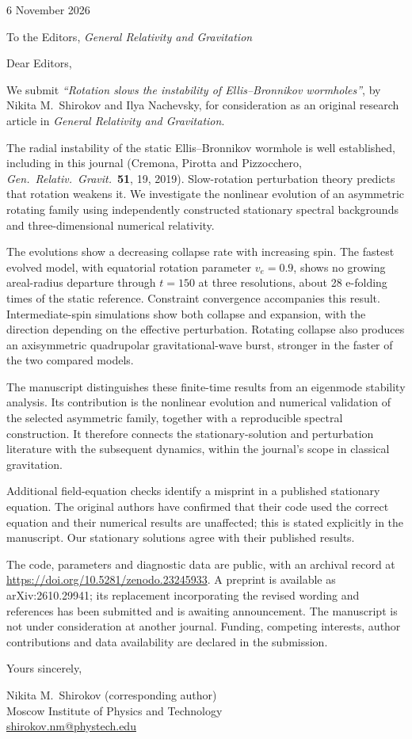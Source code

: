 \documentclass[11pt]{article}
\begin{document}
\begin{flushright}
6 November 2026
\end{flushright}
To the Editors, \emph{General Relativity and Gravitation}

Dear Editors,

We submit \emph{``Rotation slows the instability of Ellis--Bronnikov wormholes''}, by Nikita M.\ Shirokov and Ilya Nachevsky, for consideration as an original research article in \emph{General Relativity and Gravitation}.

The radial instability of the static Ellis--Bronnikov wormhole is well established, including in this journal (Cremona, Pirotta and Pizzocchero, \emph{Gen.\ Relativ.\ Gravit.}~\textbf{51}, 19, 2019). Slow-rotation perturbation theory predicts that rotation weakens it. We investigate the nonlinear evolution of an asymmetric rotating family using independently constructed stationary spectral backgrounds and three-dimensional numerical relativity.

The evolutions show a decreasing collapse rate with increasing spin. The fastest evolved model, with equatorial rotation parameter $v_e=0.9$, shows no growing areal-radius departure through $t=150$ at three resolutions, about 28 e-folding times of the static reference. Constraint convergence accompanies this result. Intermediate-spin simulations show both collapse and expansion, with the direction depending on the effective perturbation. Rotating collapse also produces an axisymmetric quadrupolar gravitational-wave burst, stronger in the faster of the two compared models.

The manuscript distinguishes these finite-time results from an eigenmode stability analysis. Its contribution is the nonlinear evolution and numerical validation of the selected asymmetric family, together with a reproducible spectral construction. It therefore connects the stationary-solution and perturbation literature with the subsequent dynamics, within the journal's scope in classical gravitation.

Additional field-equation checks identify a misprint in a published stationary equation. The original authors have confirmed that their code used the correct equation and their numerical results are unaffected; this is stated explicitly in the manuscript. Our stationary solutions agree with their published results.

The code, parameters and diagnostic data are public, with an archival record at \url{https://doi.org/10.5281/zenodo.23245933}. A preprint is available as arXiv:2610.29941; its replacement incorporating the revised wording and references has been submitted and is awaiting announcement. The manuscript is not under consideration at another journal. Funding, competing interests, author contributions and data availability are declared in the submission.

Yours sincerely,

Nikita M.\ Shirokov (corresponding author)\\
Moscow Institute of Physics and Technology\\
\href{mailto:shirokov.nm@phystech.edu}{shirokov.nm@phystech.edu}
\end{document}
